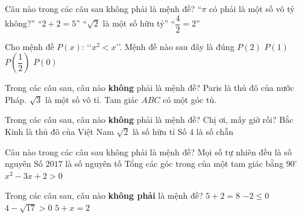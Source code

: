 \begin{ex}%
	 Câu nào trong các câu sau không phải là mệnh đề?
	\choice 
		{\True ``$\pi $  có phải là một số vô tỷ không?''}
		{``$2+2=5$''} 
		{``$\sqrt{2}$ là  một số hữu tỷ''}
		 {``$\dfrac{4}{2}=2$''}
\end{ex}

\begin{ex}%
	Cho mệnh đề $P(x)$: \lq\lq $x^2<x$\rq\rq. Mệnh đề nào sau đây  là đúng
	 \choice
		{$P(2)$} 
		 {$P(1)$}
		{\True $P\left( \dfrac{1}{2}\right)  $}
		 {$P(0)$}
\end{ex}

\begin{ex}%
	Trong các câu sau, câu nào \textbf{không} phải là mệnh đề? 
	 \def\dotEX{}
		{Paris  là thủ đô của nước Pháp.}
		 {$\sqrt{3}$ là một số vô tỉ.}
		{Tam giác $ABC$ có một  góc tù.}
\end{ex}

\begin{ex}%
	Trong các câu sau,  câu nào {\bf không} phải là mệnh đề?
	 \choice
		 {\True Chị ơi, mấy giờ rồi?}
		{Bắc  Kinh là thủ đô của Việt Nam}
		{$\sqrt{2}$  là số hữu tỉ}
		{Số  $4$ là số chẵn}
\end{ex}

\begin{ex}%
	Câu nào trong các câu sau không phải là  mệnh đề?
	 \choice
		{Mọi số tự  nhiên đều là số nguyên}
		{  Số $2017$ là số nguyên tố}
		{ Tổng các góc trong của một tam  giác bằng $90^\circ$}
		{ \True $x^2-3x+2>0$} 
\end{ex}

\begin{ex}%
	Trong các câu sau, câu nào \textbf{không phải} là mệnh đề? 
	 \choice
		 {$5+2=8 $}
		 {$-2\le 0$}
		 {$ 4-\sqrt{17}>0$}
		{\True  $5+x=2 $}
\end{ex}

